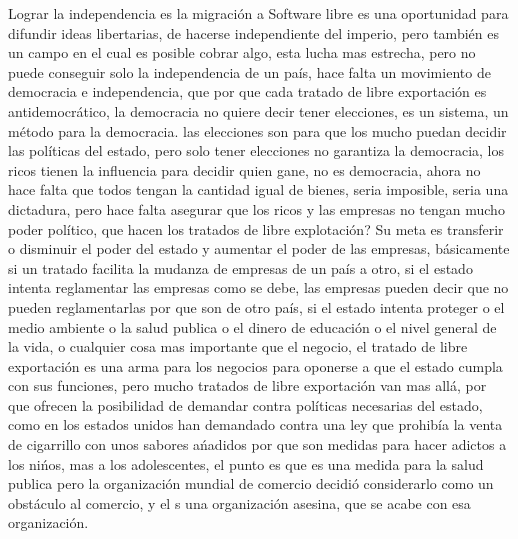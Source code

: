 \begin{multicols}{2}
{\em {\color{introcolor}{ Usted menciona dentro de la charla algo que para muchos de nosotros como Colombianos ya es sabido y es que no tenemos independencia . żcual piensa usted que es el papel que juega o jugara el software Libre para lograr la independencia en un país como este? }}}

Lograr la independencia es {\em {\color{introcolor}{ una lucha mucho mas larga que la informática, }}}la migración a Software libre es una oportunidad para difundir ideas libertarias, de hacerse independiente del imperio, pero también es un campo en el cual es posible cobrar algo, esta lucha mas estrecha,{\em {\color{introcolor}{ puede fomentar la lucha mas amplia, }}} pero no puede conseguir solo la independencia de un país, hace falta un movimiento de democracia e independencia, que {\em {\color{introcolor}{ anulemos los tratados de libre exportación, }}}por que cada tratado de libre exportación es antidemocrático, la democracia no quiere decir tener elecciones, es un sistema, un método para la democracia.
{\em {\color{introcolor}{La democracia quiere decir que los mucho pobres se unen para hacer conjuntos mas fuertes que los ricos, }}}las elecciones son para que los mucho puedan decidir las políticas  del estado, pero solo tener elecciones no garantiza la democracia, los ricos tienen la influencia para decidir quien gane, no es democracia, {\em {\color{introcolor}{ el sistema de democracia necesita mantener débiles a los ricos o mantener que nadie sea tan rico, }}}ahora no hace falta que todos tengan la cantidad igual de bienes, seria imposible, seria una dictadura, pero hace falta asegurar que los ricos y las empresas no tengan mucho poder político, que hacen los tratados de libre explotación? Su meta es transferir o disminuir el poder del estado y aumentar el poder de las empresas, básicamente si un tratado facilita la mudanza de empresas de un país a otro, si el estado intenta reglamentar las empresas como se debe, las empresas pueden decir que no pueden reglamentarlas por que son de otro país, si el estado intenta proteger o el medio ambiente o la salud publica o el dinero de educación o el nivel general de la vida, o cualquier cosa mas importante que el negocio, el tratado de libre exportación es una arma para los negocios para oponerse a que el estado cumpla con sus funciones, pero mucho tratados de libre exportación van mas allá, por que ofrecen la posibilidad de demandar contra políticas necesarias del estado, como en los estados unidos han demandado contra una ley que prohibía la venta de cigarrillo con unos sabores ańadidos por que son medidas para hacer adictos a los nińos, mas a los adolescentes, el punto es que es una medida para la salud publica pero la organización mundial de comercio decidió considerarlo como un obstáculo al comercio, y el {\em {\color{introcolor}{ omercio es mas importante que la vida según esa organización, }}}s una organización asesina, que se acabe con esa organización.





\end{multicols}
